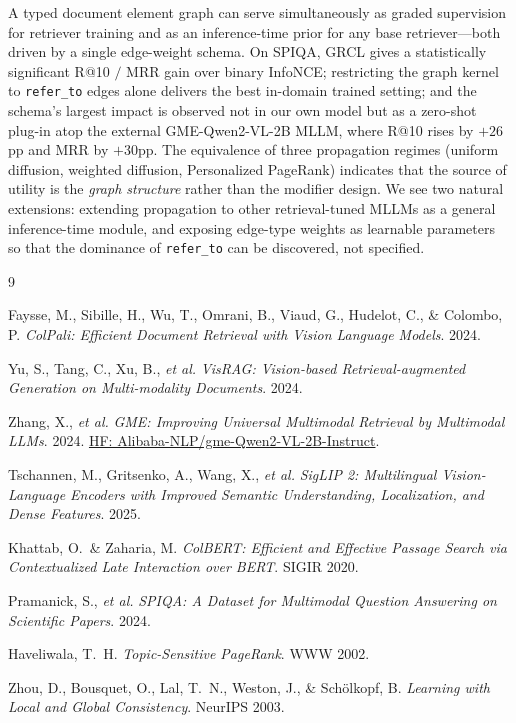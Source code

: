 \documentclass{article}
\begin{document}
A typed document element graph can serve simultaneously as graded
supervision for retriever training and as an inference-time prior for any
base retriever---both driven by a single edge-weight schema. On SPIQA,
GRCL gives a statistically significant R@10 $/$ MRR gain over binary
InfoNCE; restricting the graph kernel to \texttt{refer\_to} edges alone
delivers the best in-domain trained setting; and the schema's largest impact
is observed not in our own model but as a zero-shot plug-in atop the
external GME-Qwen2-VL-2B MLLM, where R@10 rises by $+26$pp and MRR by
$+30$pp. The equivalence of three propagation regimes (uniform diffusion,
weighted diffusion, Personalized PageRank) indicates that the source of
utility is the \emph{graph structure} rather than the modifier design.
We see two natural extensions: extending propagation to other
retrieval-tuned MLLMs as a general inference-time module, and exposing
edge-type weights as learnable parameters so that the dominance of
\texttt{refer\_to} can be discovered, not specified.


\begin{thebibliography}{9}

Faysse, M., Sibille, H., Wu, T., Omrani, B., Viaud, G., Hudelot, C., \& Colombo, P.
\textit{ColPali: Efficient Document Retrieval with Vision Language Models}. 2024.

Yu, S., Tang, C., Xu, B., \textit{et al.}
\textit{VisRAG: Vision-based Retrieval-augmented Generation on Multi-modality Documents}. 2024.

Zhang, X., \textit{et al.}
\textit{GME: Improving Universal Multimodal Retrieval by Multimodal LLMs}. 2024.
\href{https://huggingface.co/Alibaba-NLP/gme-Qwen2-VL-2B-Instruct}{HF: Alibaba-NLP/gme-Qwen2-VL-2B-Instruct}.

Tschannen, M., Gritsenko, A., Wang, X., \textit{et al.}
\textit{SigLIP 2: Multilingual Vision-Language Encoders with Improved Semantic Understanding, Localization, and Dense Features}. 2025.

Khattab, O.\ \& Zaharia, M.
\textit{ColBERT: Efficient and Effective Passage Search via Contextualized Late Interaction over BERT}. SIGIR 2020.

Pramanick, S., \textit{et al.}
\textit{SPIQA: A Dataset for Multimodal Question Answering on Scientific Papers}. 2024.

Haveliwala, T.\ H.
\textit{Topic-Sensitive PageRank}. WWW 2002.

Zhou, D., Bousquet, O., Lal, T.~N., Weston, J., \& Schölkopf, B.
\textit{Learning with Local and Global Consistency}. NeurIPS 2003.

\end{thebibliography}
\end{document}
